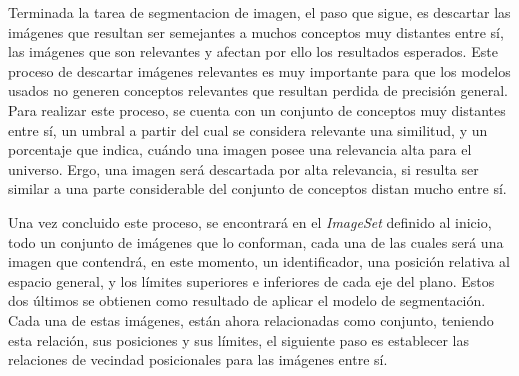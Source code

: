 Terminada la tarea de segmentacion de imagen, el paso que sigue, es descartar las imágenes que resultan ser semejantes a muchos conceptos muy distantes entre sí, las imágenes que son relevantes y afectan por ello los resultados esperados. Este proceso de descartar imágenes relevantes es muy importante para que los modelos usados no generen conceptos relevantes que resultan perdida de precisi\'on general. Para realizar este proceso, se cuenta con un conjunto de conceptos muy distantes entre sí, un umbral a partir del cual se considera relevante una similitud, y un porcentaje que indica, cu\'ando una imagen posee una relevancia alta para el universo. Ergo, una imagen ser\'a descartada por alta relevancia, si resulta ser similar a una parte considerable del conjunto de conceptos distan mucho entre s\'i.

Una vez concluido este proceso, se encontrará en el \textit{ImageSet} definido al inicio, todo un conjunto de imágenes que lo conforman, cada una de las cuales será una imagen que contendrá, en este momento, un identificador, una posición relativa al espacio general, y los límites superiores e inferiores de cada eje del plano. Estos dos últimos se obtienen como resultado de aplicar el modelo de segmentación. Cada una de estas imágenes, están ahora relacionadas como conjunto, teniendo esta relación, sus posiciones y sus límites, el siguiente paso es establecer las relaciones de vecindad posicionales para las imágenes entre s\'i.

